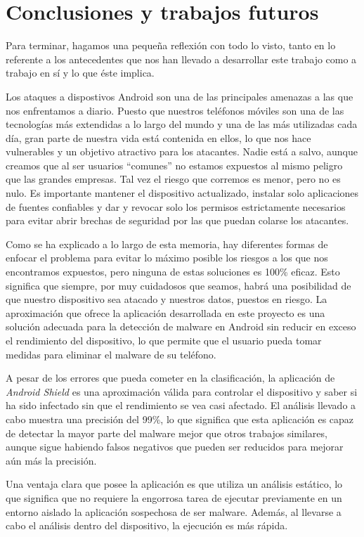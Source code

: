 \chapter{Conclusiones y trabajos futuros}

Para terminar, hagamos una pequeña reflexión con todo lo visto, tanto en lo referente a los antecedentes que nos han llevado a desarrollar este trabajo como a trabajo en sí y lo que éste implica.

Los ataques a dispostivos Android son una de las principales amenazas a las que nos enfrentamos a diario. Puesto que nuestros teléfonos móviles son una de las tecnologías más extendidas a lo largo del mundo y una de las más utilizadas cada día, gran parte de nuestra vida está contenida en ellos, lo que nos hace vulnerables y un objetivo atractivo para los atacantes. Nadie está a salvo, aunque creamos que al ser usuarios ``comunes'' no estamos expuestos al mismo peligro que las grandes empresas. Tal vez el riesgo que corremos es menor, pero no es nulo. Es importante mantener el dispositivo actualizado, instalar solo aplicaciones de fuentes confiables y dar y revocar solo los permisos estrictamente necesarios para evitar abrir brechas de seguridad por las que puedan colarse los atacantes.

Como se ha explicado a lo largo de esta memoria, hay diferentes formas de enfocar el problema para evitar lo máximo posible los riesgos a los que nos encontramos expuestos, pero ninguna de estas soluciones es 100\% eficaz. Esto significa que siempre, por muy cuidadosos que seamos, habrá una posibilidad de que nuestro dispositivo sea atacado y nuestros datos, puestos en riesgo. La aproximación que ofrece la aplicación desarrollada en este proyecto es una solución adecuada para la detección de malware en Android sin reducir en exceso el rendimiento del dispositivo, lo que permite que el usuario pueda tomar medidas para eliminar el malware de su teléfono.

A pesar de los errores que pueda cometer en la clasificación, la aplicación de \textit{Android Shield} es una aproximación válida para controlar el dispositivo y saber si ha sido infectado sin que el rendimiento se vea casi afectado. El análisis llevado a cabo muestra una precisión del 99\%, lo que significa que esta aplicación es capaz de detectar la mayor parte del malware mejor que otros trabajos similares, aunque sigue habiendo falsos negativos que pueden ser reducidos para mejorar aún más la precisión.

Una ventaja clara que posee la aplicación es que utiliza un análisis estático, lo que significa que no requiere la engorrosa tarea de ejecutar previamente en un entorno aislado la aplicación sospechosa de ser malware. Además, al llevarse a cabo el análisis dentro del dispositivo, la ejecución es más rápida.

